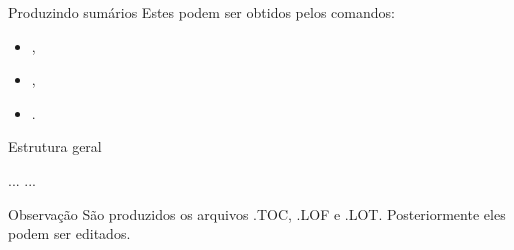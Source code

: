 
\begin{frame}{Produzindo sumários}
Estes podem ser obtidos pelos comandos: 
\begin{itemize}
\item {},
\item {}, 
\item {}.
\end{itemize}
\end{frame}

\begin{frame}{Estrutura geral}
\begin{LaTeXcode}
\n
...\n
{}\n
{}\n
{}\n
{}\n
{}\n
{}\n
...\n
{}
\end{LaTeXcode}

\begin{block}{Observação}
São produzidos os arquivos .TOC, .LOF e .LOT. Posteriormente eles podem ser editados.
\end{block}
\end{frame}